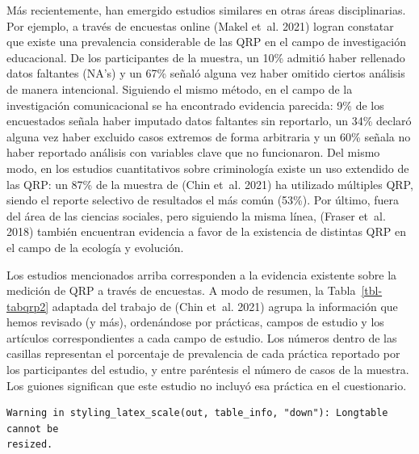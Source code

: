 \documentclass[
  spanish,
  letterpaper,
  DIV=11,
  numbers=noendperiod]{scrreprt}
\begin{document}
Más recientemente, han emergido estudios similares en otras áreas
disciplinarias. Por ejemplo, a través de encuestas online (Makel et~al.
2021) logran constatar que existe una prevalencia considerable de las
QRP en el campo de investigación educacional. De los participantes de la
muestra, un 10\% admitió haber rellenado datos faltantes (NA's) y un
67\% señaló alguna vez haber omitido ciertos análisis de manera
intencional. Siguiendo el mismo método, en el campo de la investigación
comunicacional se ha encontrado evidencia parecida: 9\% de los
encuestados señala haber imputado datos faltantes sin reportarlo, un
34\% declaró alguna vez haber excluido casos extremos de forma
arbitraria y un 60\% señala no haber reportado análisis con variables
clave que no funcionaron. Del mismo modo, en los estudios cuantitativos
sobre criminología existe un uso extendido de las QRP: un 87\% de la
muestra de (Chin et~al. 2021) ha utilizado múltiples QRP, siendo el
reporte selectivo de resultados el más común (53\%). Por último, fuera
del área de las ciencias sociales, pero siguiendo la misma línea,
(Fraser et~al. 2018) también encuentran evidencia a favor de la
existencia de distintas QRP en el campo de la ecología y evolución.

Los estudios mencionados arriba corresponden a la evidencia existente
sobre la medición de QRP a través de encuestas. A modo de resumen, la
Tabla~\ref{tbl-tabqrp2} adaptada del trabajo de (Chin et~al. 2021)
agrupa la información que hemos revisado (y más), ordenándose por
prácticas, campos de estudio y los artículos correspondientes a cada
campo de estudio. Los números dentro de las casillas representan el
porcentaje de prevalencia de cada práctica reportado por los
participantes del estudio, y entre paréntesis el número de casos de la
muestra. Los guiones significan que este estudio no incluyó esa práctica
en el cuestionario.

\begin{verbatim}
Warning in styling_latex_scale(out, table_info, "down"): Longtable cannot be
resized.
\end{verbatim}
\end{document}

